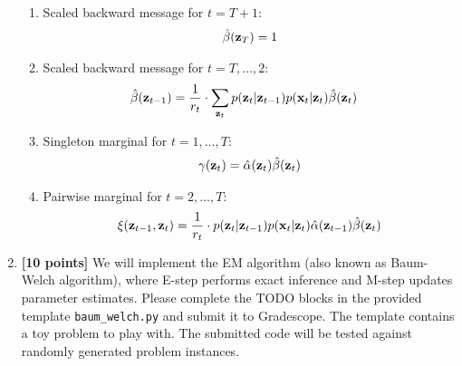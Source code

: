 \documentclass{article}
\begin{document}
\begin{enumerate}
\begin{algorithm}[h]
\begin{enumerate}
\item Scaled backward message for $ t = T + 1 $:
\begin{align}
\hat{\beta} (\mathbf{z}_T)  = 1
\end{align}

\item Scaled backward message for $ t = T, \dotsc, 2 $:
\begin{align}
\hat{\beta} (\mathbf{z}_{t-1}) 
& = \frac{1}{r_t}  \cdot \sum_{\mathbf{z}_t} p(\mathbf{z}_t | \mathbf{z}_{t-1})   p(\mathbf{x}_t | \mathbf{z}_t) \hat{\beta} (\mathbf{z}_t)
\end{align}

\item Singleton marginal for $ t = 1, \dotsc, T $:
\begin{align}
\gamma (\mathbf{z}_t)  
= \hat{\alpha} (\mathbf{z}_t) \hat{\beta} (\mathbf{z}_t)
\end{align}

\item Pairwise marginal for $ t = 2, \dotsc, T $:
\begin{align}
\xi(\mathbf{z}_{t-1}, \mathbf{z}_t) 
= \frac{1}{r_t} \cdot p(\mathbf{z}_t | \mathbf{z}_{t-1}) p(\mathbf{x}_t | \mathbf{z}_t)   \hat{\alpha}  (\mathbf{z}_{t-1}) \hat{\beta} (\mathbf{z}_t)
\end{align}


\end{enumerate}
\end{algorithm}





\item 
\textbf{[10 points]}
We will implement the EM algorithm (also known as Baum-Welch algorithm), where E-step performs exact inference and M-step updates parameter estimates.
Please complete the TODO blocks in the provided template \verb|baum_welch.py| and submit it to Gradescope.
The template contains a toy problem to play with. 
The submitted code will be tested against randomly generated problem instances. 






\end{enumerate}







% 
% 
\end{document}
